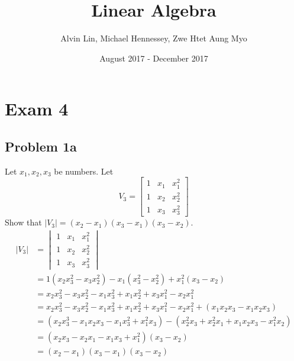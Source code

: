 \documentclass{math}
\title{Linear Algebra}
\author{Alvin Lin, Michael Hennessey, Zwe Htet Aung Myo}
\date{August 2017 - December 2017}
\begin{document}
\maketitle

\section*{Exam 4}

\subsection*{Problem 1a}
Let \( x_1, x_2, x_3 \) be numbers. Let
\[ V_3 = \begin{bmatrix}
  1 & x_1 & x_1^2 \\
  1 & x_2 & x_2^2 \\
  1 & x_3 & x_3^2
\end{bmatrix} \]
Show that \( |V_3| = (x_2-x_1)(x_3-x_1)(x_3-x_2) \).
\begin{align*}
  |V_3| &= \begin{vmatrix}
    1 & x_1 & x_1^2 \\
    1 & x_2 & x_2^2 \\
    1 & x_3 & x_3^2
  \end{vmatrix} \\
  &= 1(x_2x_3^2-x_3x_2^2)-x_1(x_3^2-x_2^2)+x_1^2(x_3-x_2) \\
  &= x_2x_3^2-x_3x_2^2-x_1x_3^2+x_1x_2^2+x_3x_1^2-x_2x_1^2 \\
  &= x_2x_3^2-x_3x_2^2-x_1x_3^2+x_1x_2^2+x_3x_1^2-x_2x_1^2+
    (x_1x_2x_3-x_1x_2x_3) \\
  &= (x_2x_3^3-x_1x_2x_3-x_1x_3^2+x_1^2x_3)-
    (x_2^2x_3+x_2^2x_1+x_1x_2x_3-x_1^2x_2) \\
  &= (x_2x_3-x_2x_1-x_1x_3+x_1^2)(x_3-x_2) \\
  &= (x_2-x_1)(x_3-x_1)(x_3-x_2)
\end{align*}
\end{document}
